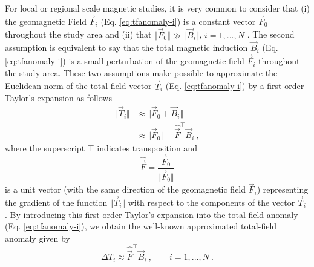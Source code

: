 \documentclass[journal abbreviation, npg]{copernicus}
\begin{document}
For local or regional scale magnetic studies, it is very common to consider that (i) the geomagnetic Field $\vec{F}_i$ (Eq. \ref{eq:tfanomaly-i}) is a constant vector $\vec{F}_{0}$ throughout the study area and (ii) that $\Vert \vec{F}_{0} \Vert \gg \Vert \vec{B}_{i} \Vert$, $i = 1, ..., N$ \citep{telford-etal1990, blakely1996}. The second assumption is equivalent to say that the total magnetic induction $\vec{B}_i$ (Eq. \ref{eq:tfanomaly-i}) is a small perturbation of the geomagnetic field $\vec{F}_i$ throughout the study area. These two assumptions make possible to approximate the Euclidean norm of the total-field vector $\vec{T}_i$ (Eq. \ref{eq:tfanomaly-i}) by a first-order Taylor's expansion as follows
\begin{equation}
\begin{array}{cl}
\Vert \vec{T}_{i} \Vert & 
\approx \Vert \vec{F}_{0} + \vec{B}_{i} \Vert \\
\: &
\approx \Vert \vec{F}_{0} \Vert + \hat{\vec{F}}^{\intercal}\vec{B}_{i} \: ,
\end{array}
\label{eq:total-field-app}
\end{equation}
where the superscript $\intercal$ indicates transposition and
\begin{equation}
\hat{\vec{F}} = \dfrac{\vec{F}_{0}}{\Vert \vec{F}_{0} \Vert}
\label{eq:unit-vector}
\end{equation}
is a unit vector (with the same direction of the geomagnetic field $\vec{F}_i$) representing the gradient of the function $\Vert \vec{T}_{i} \Vert$ with respect to the components of the vector $\vec{T}_{i}$ \citep{blakely1996}. By introducing this first-order Taylor's expansion into the total-field anomaly (Eq. \ref{eq:tfanomaly-i}), we obtain the well-known approximated total-field anomaly given by
\begin{equation}
\Delta T_{i} \approx \hat{\vec{F}}^{\intercal}\vec{B}_{i} \: , \qquad i = 1, ..., N \: .
\label{eq:approx-tfanomaly-i}
\end{equation}
\end{document}
